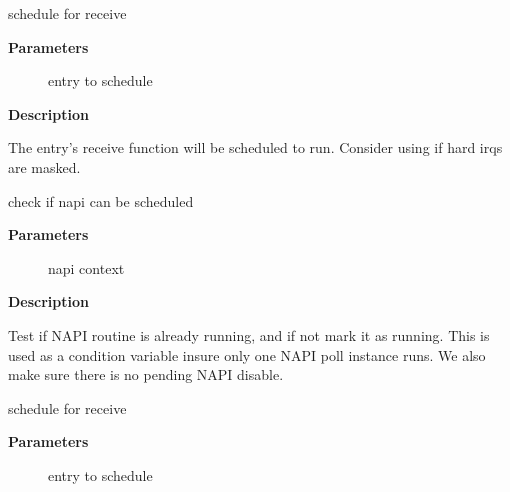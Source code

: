 \documentclass[a4paper,8pt,english]{sphinxmanual}
\begin{document}
\begin{fulllineitems}
\label{networking/kapi:c.__napi_schedule}
schedule for receive

\end{fulllineitems}


\textbf{Parameters}
\begin{description}
\item[{}] \leavevmode
entry to schedule

\end{description}

\textbf{Description}

The entry's receive function will be scheduled to run.
Consider using {\hyperref[networking/kapi:c.__napi_schedule_irqoff]{\emph{}}} if hard irqs are masked.

\begin{fulllineitems}
\label{networking/kapi:c.napi_schedule_prep}
check if napi can be scheduled

\end{fulllineitems}


\textbf{Parameters}
\begin{description}
\item[{}] \leavevmode
napi context

\end{description}

\textbf{Description}

Test if NAPI routine is already running, and if not mark
it as running.  This is used as a condition variable
insure only one NAPI poll instance runs.  We also make
sure there is no pending NAPI disable.

\begin{fulllineitems}
\label{networking/kapi:c.__napi_schedule_irqoff}
schedule for receive

\end{fulllineitems}


\textbf{Parameters}
\begin{description}
\item[{}] \leavevmode
entry to schedule

\end{description}
\end{document}
